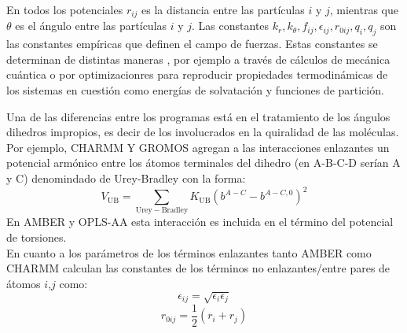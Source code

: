 En todos los potenciales $r_{ij}$ es la distancia entre las part\'{i}culas $i$ y $j$, mientras que $\theta$ es el \'{a}ngulo entre las part\'{i}culas $i$ y $j$. Las constantes $k_r,k_\theta,f_{ij},\epsilon_{ij},r_{0ij},q_{i},q_{j}$ son las constantes emp\'{i}ricas que definen el campo de fuerzas. Estas constantes se determinan de distintas maneras , por ejemplo a trav\'{e}s de c\'{a}lculos de mec\'{a}nica cu\'{a}ntica o por optimizacionres para reproducir propiedades termodin\'{a}micas de los sistemas en cuesti\'{o}n como energ\'{i}as de solvataci\'{o}n y funciones de partici\'{o}n.

Una de las diferencias entre los programas est\'{a} en el tratamiento de los \'{a}ngulos dihedros impropios, es decir de los involucrados en la quiralidad de las mol\'{e}culas. Por ejemplo, CHARMM Y GROMOS agregan a las interacciones enlazantes un potencial arm\'{o}nico entre los \'{a}tomos terminales del dihedro (en A-B-C-D ser\'{i}an A y C) denomindado de Urey-Bradley con la forma:
\begin{equation}\label{eq:5}
    V_{\mathrm{UB}}=\sum_{\mathrm{Urey-Bradley}} K_{\mathrm{UB}}(b^{A-C}-b^{A-C,0})^2
\end{equation}
En AMBER y OPLS-AA esta interacci\'{o}n es incluida en el t\'{e}rmino del potencial de torsiones.\\

En cuanto a los par\'{a}metros de los t\'{e}rminos enlazantes tanto AMBER como CHARMM calculan las constantes de los t\'{e}rminos no enlazantes/entre pares de \'{a}tomos $i$,$j$ como:
\begin{equation}\label{eq:6}
   \epsilon_{ij}=\sqrt{\epsilon_{i}\epsilon_{j}}
\end{equation}
\begin{equation}\label{eq:7}
   r_{0ij}=\frac{1}{2}\left(r_i+r_j\right)
\end{equation}
